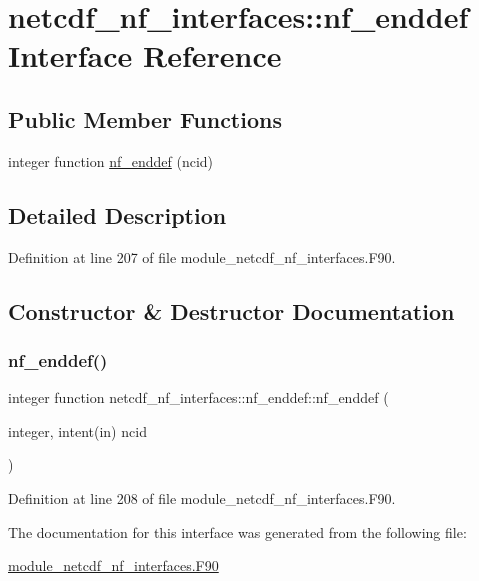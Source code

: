 \hypertarget{interfacenetcdf__nf__interfaces_1_1nf__enddef}{}\section{netcdf\+\_\+nf\+\_\+interfaces\+:\+:nf\+\_\+enddef Interface Reference}
\label{interfacenetcdf__nf__interfaces_1_1nf__enddef}
\subsection*{Public Member Functions}
\begin{DoxyCompactItemize}
\item 
integer function \hyperlink{interfacenetcdf__nf__interfaces_1_1nf__enddef_a3b8ca0b15f5d11e6dd7fbc563f8cff66}{nf\+\_\+enddef} (ncid)
\end{DoxyCompactItemize}


\subsection{Detailed Description}


Definition at line 207 of file module\+\_\+netcdf\+\_\+nf\+\_\+interfaces.\+F90.



\subsection{Constructor \& Destructor Documentation}
\mbox{\label{interfacenetcdf__nf__interfaces_1_1nf__enddef_a3b8ca0b15f5d11e6dd7fbc563f8cff66}} 
\subsubsection{\texorpdfstring{nf\+\_\+enddef()}{nf\_enddef()}}
{\footnotesize\ttfamily integer function netcdf\+\_\+nf\+\_\+interfaces\+::nf\+\_\+enddef\+::nf\+\_\+enddef (\begin{DoxyParamCaption}\item[{integer, intent(in)}]{ncid }\end{DoxyParamCaption})}



Definition at line 208 of file module\+\_\+netcdf\+\_\+nf\+\_\+interfaces.\+F90.



The documentation for this interface was generated from the following file\+:\begin{DoxyCompactItemize}
\item 
\hyperlink{module__netcdf__nf__interfaces_8F90}{module\+\_\+netcdf\+\_\+nf\+\_\+interfaces.\+F90}\end{DoxyCompactItemize}
